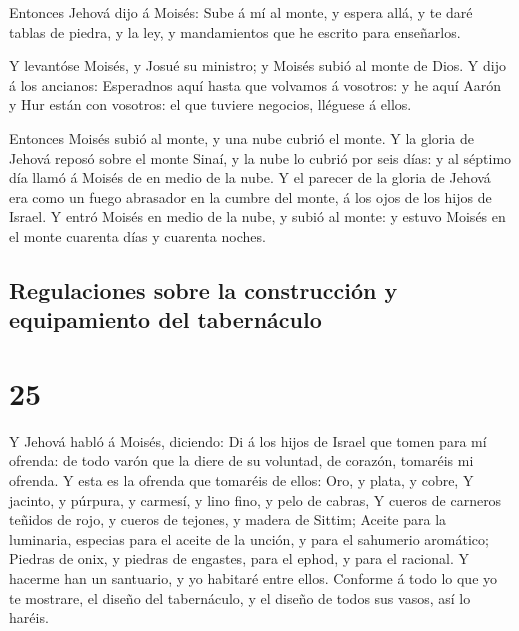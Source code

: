  Entonces Jehová dijo á Moisés: Sube á mí al monte, y
espera allá, y te daré tablas de piedra, y la ley, y mandamientos que he
escrito para enseñarlos.

 Y levantóse Moisés, y Josué su ministro; y Moisés subió
al monte de Dios.  Y dijo á los ancianos: Esperadnos aquí
hasta que volvamos á vosotros: y he aquí Aarón y Hur están con vosotros:
el que tuviere negocios, lléguese á ellos.

 Entonces Moisés subió al monte, y una nube cubrió el
monte.  Y la gloria de Jehová reposó sobre el monte
Sinaí, y la nube lo cubrió por seis días: y al séptimo día llamó á
Moisés de en medio de la nube.  Y el parecer de la gloria
de Jehová era como un fuego abrasador en la cumbre del monte, á los ojos
de los hijos de Israel.  Y entró Moisés en medio de la
nube, y subió al monte: y estuvo Moisés en el monte cuarenta días y
cuarenta noches.

\hypertarget{regulaciones-sobre-la-construcciuxf3n-y-equipamiento-del-tabernuxe1culo}{%
\subsection{Regulaciones sobre la construcción y equipamiento del
tabernáculo}\label{regulaciones-sobre-la-construcciuxf3n-y-equipamiento-del-tabernuxe1culo}}

\hypertarget{section-02-25}{%
\section{25}\label{section-02-25}}

 Y Jehová habló á Moisés, diciendo:  Di á
los hijos de Israel que tomen para mí ofrenda: de todo varón que la
diere de su voluntad, de corazón, tomaréis mi ofrenda.  Y
esta es la ofrenda que tomaréis de ellos: Oro, y plata, y cobre,
 Y jacinto, y púrpura, y carmesí, y lino fino, y pelo de
cabras,  Y cueros de carneros teñidos de rojo, y cueros de
tejones, y madera de Sittim;  Aceite para la luminaria,
especias para el aceite de la unción, y para el sahumerio aromático;
 Piedras de onix, y piedras de engastes, para el ephod, y
para el racional.  Y hacerme han un santuario, y yo
habitaré entre ellos.  Conforme á todo lo que yo te
mostrare, el diseño del tabernáculo, y el diseño de todos sus vasos, así
lo haréis.

